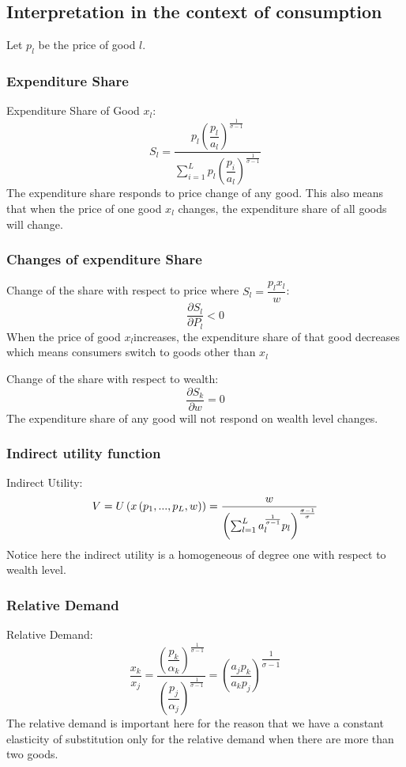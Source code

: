 \subsection{Interpretation in the context of consumption}
Let $p_{l}$ be the price of good $l$.
\subsubsection{Expenditure Share}
Expenditure Share of Good $x_l$:
\begin{equation}
	S_{l} = \dfrac{p_{l}\left(\dfrac{p_{l}}{a_{l}}\right)^{\frac{1}{ \sigma -1}}}{ \sum_{i=1}^L {p_{l}{\left(\dfrac{p_{i} }{a_{l}}\right)^{\frac{1}{ \sigma -1}}}}}
\end{equation}
The expenditure share responds to price change of any good. This also means that when the price of one good $x_l$ changes, the expenditure share of all goods will change.
\subsubsection{Changes of expenditure Share}
Change of the share with respect to price where $S_l = \dfrac{p_lx_l}{w}$:
\begin{equation}
	\frac{\partial{S_{l}}}{\partial{P_{l}}} <0
\end{equation}
When the price of good $x_l$increases, the expenditure share of that good decreases which means consumers switch to goods other than $x_l$

Change of the share with respect to wealth:
\begin{equation}
	\frac{\partial{S_{k}}}{\partial{w}} = 0
\end{equation}
The expenditure share of any good will not respond on wealth level changes.
\subsubsection{Indirect utility function}
Indirect Utility:
\begin{equation}
  	V= U\left(x\left(p_{1},...,p_{L},w\right)\right) = \frac{w}{ \left(\sum_{l=1}^La_{l}^{\frac{\-1}{\sigma-1}}p_{l}\right)^{\frac{\sigma-1}{ \sigma}}}
\end{equation}
Notice here the indirect utility is a homogeneous of degree one with respect to wealth level.
\subsubsection{Relative Demand}
Relative Demand:
\begin{equation}
	\frac{x_{k}}{x_{j}} = \dfrac{\left(\dfrac{p_{k}}{\alpha_{k}}\right)^{\frac{1}{ \sigma -1}}}{\left(\dfrac{ p_{j} }{\alpha_{j}}\right)^{\frac{1}{ \sigma -1}}} = \left(\dfrac{a_jp_{k}}{a_kp_{j}}\right)^{\dfrac{1}{ \sigma -1}} \label{eq:reldemand}
\end{equation}
The relative demand is important here for the reason that we have a constant elasticity of substitution only for the relative demand when there are more than two goods.
